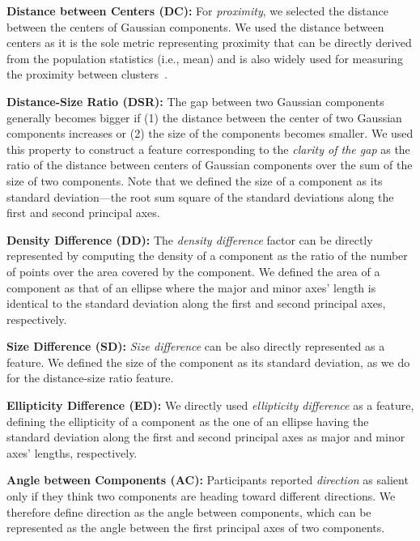 \noindent
\textbf{Distance between Centers (DC):}
For 
\textit{proximity}, we selected the distance between the centers of Gaussian components. We used the distance between centers as it is the sole metric representing proximity that can be directly derived from the population statistics (i.e., mean) and is also widely used for measuring the proximity between clusters~\cite{liu10icdm}. 

\noindent
\textbf{Distance-Size Ratio (DSR):}
The gap between two Gaussian components generally becomes bigger if (1) the distance between the center of two Gaussian components increases or (2) the size of the components becomes smaller. 
We used this property to construct a feature corresponding to the \textit{clarity of the gap} as the ratio of the distance between centers of Gaussian components over the sum of the size of two components. Note that we defined the size of a component as its standard deviation---the root sum square of the standard deviations along the first and second principal axes.

\noindent
\textbf{Density Difference (DD):}
The \textit{density difference} factor can be directly represented
by computing the density of a component as the ratio of the number of points over the area covered by the component. 
We defined the area of a component as 
that of an ellipse where the major and minor axes' length is identical to the standard deviation along the first and second principal axes, respectively. 

\noindent
\textbf{Size Difference (SD):}
\textit{Size difference} 
can be also directly represented as a feature. We defined the size of the component as its standard deviation, as we do for the distance-size ratio feature.

\noindent
\textbf{Ellipticity Difference (ED):}
We directly used \textit{ellipticity difference} 
as a feature, 
defining the ellipticity of a component as the one of an ellipse having the standard deviation along the first and second principal axes as major and minor axes' lengths, respectively.

\noindent
\textbf{Angle between Components (AC):}
Participants reported \textit{direction} as salient only if they think two components are heading toward different directions. 
We therefore define direction as the angle between components, which can be represented as the angle between the first principal axes of two components. 

